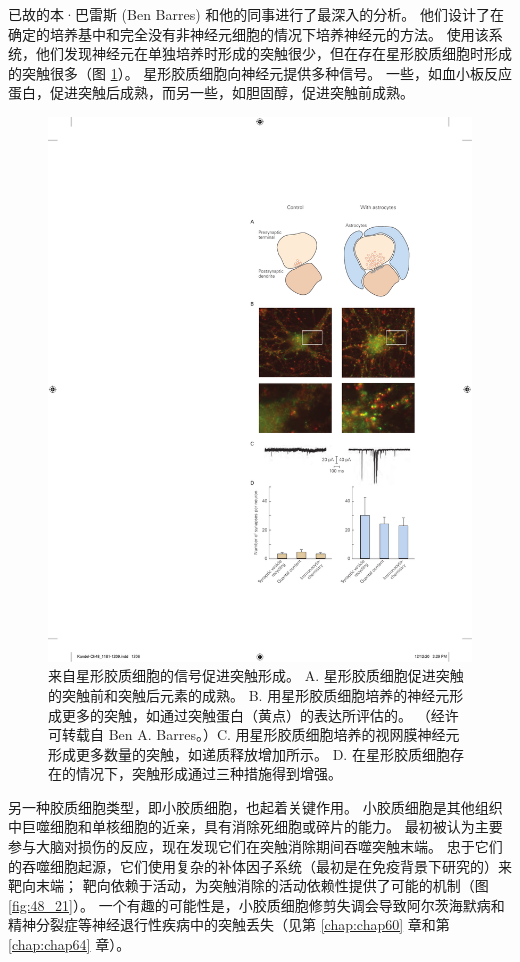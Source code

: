已故的本·巴雷斯 (Ben Barres) 和他的同事进行了最深入的分析。 他们设计了在确定的培养基中和完全没有非神经元细胞的情况下培养神经元的方法。 
使用该系统，他们发现神经元在单独培养时形成的突触很少，但在存在星形胶质细胞时形成的突触很多（图 \ref{fig:48_20}）。 
星形胶质细胞向神经元提供多种信号。 一些，如血小板反应蛋白，促进突触后成熟，而另一些，如胆固醇，促进突触前成熟。

\begin{figure}[htbp]
	\centering
	\includegraphics[width=0.5\linewidth]{chap48/fig_48_20}
	\caption{来自星形胶质细胞的信号促进突触形成。 A. 星形胶质细胞促进突触的突触前和突触后元素的成熟。 B. 用星形胶质细胞培养的神经元形成更多的突触，如通过突触蛋白（黄点）的表达所评估的。 （经许可转载自 Ben A. Barres。）C. 用星形胶质细胞培养的视网膜神经元形成更多数量的突触，如递质释放增加所示。 D. 在星形胶质细胞存在的情况下，突触形成通过三种措施得到增强。}
	\label{fig:48_20}
\end{figure}

另一种胶质细胞类型，即小胶质细胞，也起着关键作用。 小胶质细胞是其他组织中巨噬细胞和单核细胞的近亲，具有消除死细胞或碎片的能力。 最初被认为主要参与大脑对损伤的反应，现在发现它们在突触消除期间吞噬突触末端。 
忠于它们的吞噬细胞起源，它们使用复杂的补体因子系统（最初是在免疫背景下研究的）来靶向末端； 靶向依赖于活动，为突触消除的活动依赖性提供了可能的机制（图 \ref{fig:48_21}）。 
一个有趣的可能性是，小胶质细胞修剪失调会导致阿尔茨海默病和精神分裂症等神经退行性疾病中的突触丢失（见第 \ref{chap:chap60} 章和第 \ref{chap:chap64} 章）。


